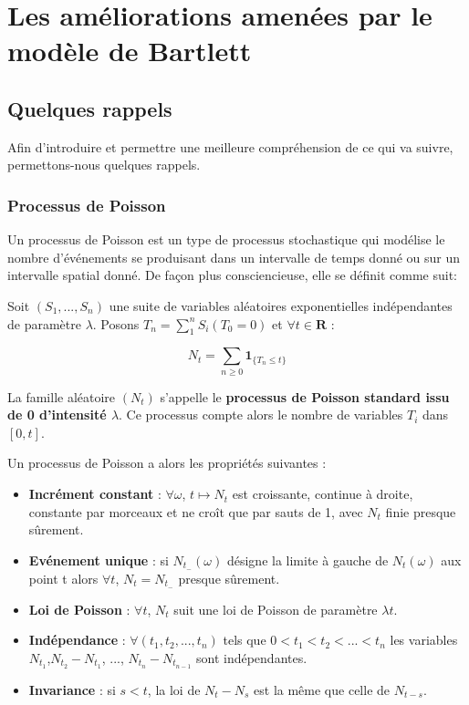 \section{Les améliorations amenées par le modèle de Bartlett}

\subsection{Quelques rappels}
Afin d'introduire et permettre une meilleure compréhension de ce qui va suivre, permettons-nous quelques rappels.

\subsubsection{Processus de Poisson}
Un processus de Poisson est un type de processus stochastique qui modélise le nombre d'événements se produisant dans un intervalle de temps donné ou sur un intervalle spatial donné.
De façon plus consciencieuse, elle se définit comme suit:

Soit $(S_1, ..., S_n)$ une suite de variables aléatoires exponentielles indépendantes de paramètre $\lambda$. Posons $T_n = \sum^n_1 S_i (T_0 = 0)$ et $\forall t \in \boldsymbol{R}$ :

\begin{center}
    $$ N_t = \sum_{n \geq 0} \boldsymbol{1}_{\{T_n \leq t \}} $$
\end{center}

La famille aléatoire $(N_t)$ s'appelle le \textbf{processus de Poisson standard issu de 0 d'intensité $\lambda$}. Ce processus compte alors le nombre de variables $T_i$ dans $[0, t]$.

Un processus de Poisson a alors les propriétés suivantes :
	\begin{itemize}[label=$\bullet$]
    	\item \textbf{Incrément constant} : $\forall \omega$, $t \mapsto N_t$ est croissante, continue à droite, constante par morceaux et ne croît que par sauts de 1, avec  $N_t$ finie presque sûrement.
    	\item \textbf{Evénement unique} : si $N_{t_-}(\omega)$ désigne la limite à gauche de $N_t(\omega)$ aux point t alors $\forall t$, $N_t = N_{t_-}$ presque sûrement.  	
    	\item \textbf{Loi de Poisson} : $\forall t$, $N_t$ suit une loi de Poisson de paramètre $\lambda t$.
    	\item \textbf{Indépendance} : $\forall (t_1, t_2, ..., t_n)$ tels que $0 < t_1 < t_2 < ... < t_n$ les variables $N_{t_1}$,$N_{t_2} - N_{t_1}$, ..., $N_{t_n} - N_{t_{n-1}}$ sont indépendantes.
    	 \item \textbf{Invariance} : si $s < t$, la loi de $N_t - N_s$ est la même que celle de $N_{t - s}$.
    	 \end{itemize}

